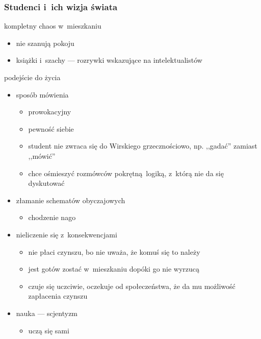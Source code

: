 \subsubsection*{Studenci i~ich wizja świata}
\begin{description}
    \item kompletny chaos w~mieszkaniu
        \begin{itemize}
            \item nie szanują pokoju
            \item książki i~szachy --- rozrywki wskazujące na intelektualistów
        \end{itemize}
    \item podejście do życia
        \begin{itemize}
            \item sposób mówienia
                \begin{itemize}
                    \item prowokacyjny
                    \item pewność siebie
                    \item student nie zwraca się do Wirskiego grzecznościowo, np. ,,gadać'' zamiast ,,mówić''
                    \item chce ośmieszyć rozmówców pokrętną logiką, z~którą nie da się dyskutować
                \end{itemize}
            \item złamanie schematów obyczajowych
                \begin{itemize}
                    \item chodzenie nago
                \end{itemize}
            \item nieliczenie się z~konsekwencjami
                \begin{itemize}
                    \item nie płaci czynszu, bo nie uważa, że komuś się to należy
                    \item jest gotów zostać w~mieszkaniu dopóki go nie wyrzucą
                    \item czuje się uczciwie, oczekuje od społeczeństwa, że da mu możliwość zapłacenia czynszu
                \end{itemize}
            \item nauka --- scjentyzm
                \begin{itemize}
                    \item uczą się sami

\end{itemize}
\end{itemize}
\end{description}
